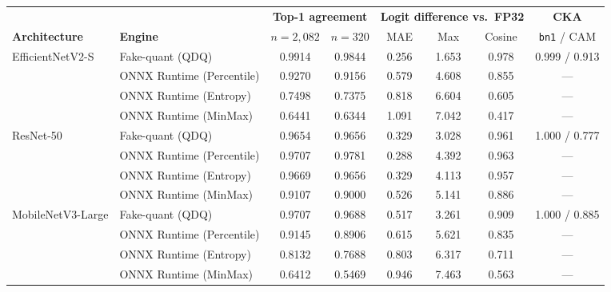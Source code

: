 \begin{tabular}{llcccccc}
\toprule
 & & \multicolumn{2}{c}{\textbf{Top-1 agreement}} & \multicolumn{3}{c}{\textbf{Logit difference vs.\ FP32}} & \textbf{CKA} \\
\cmidrule(lr){3-4}\cmidrule(lr){5-7}\cmidrule(lr){8-8}
\textbf{Architecture} & \textbf{Engine} & $n{=}2{,}082$ & $n{=}320$ & MAE & Max & Cosine & \texttt{bn1} / CAM \\
\midrule
\multirow{4}{*}{EfficientNetV2-S}
  & Fake-quant (QDQ) & 0.9914 & 0.9844 & 0.256 & 1.653 & 0.978 & 0.999 / 0.913 \\
  & ONNX Runtime (Percentile) & 0.9270 & 0.9156 & 0.579 & 4.608 & 0.855 & --- \\
  & ONNX Runtime (Entropy) & 0.7498 & 0.7375 & 0.818 & 6.604 & 0.605 & --- \\
  & ONNX Runtime (MinMax) & 0.6441 & 0.6344 & 1.091 & 7.042 & 0.417 & --- \\
\midrule
\multirow{4}{*}{ResNet-50}
  & Fake-quant (QDQ) & 0.9654 & 0.9656 & 0.329 & 3.028 & 0.961 & 1.000 / 0.777 \\
  & ONNX Runtime (Percentile) & 0.9707 & 0.9781 & 0.288 & 4.392 & 0.963 & --- \\
  & ONNX Runtime (Entropy) & 0.9669 & 0.9656 & 0.329 & 4.113 & 0.957 & --- \\
  & ONNX Runtime (MinMax) & 0.9107 & 0.9000 & 0.526 & 5.141 & 0.886 & --- \\
\midrule
\multirow{4}{*}{MobileNetV3-Large}
  & Fake-quant (QDQ) & 0.9707 & 0.9688 & 0.517 & 3.261 & 0.909 & 1.000 / 0.885 \\
  & ONNX Runtime (Percentile) & 0.9145 & 0.8906 & 0.615 & 5.621 & 0.835 & --- \\
  & ONNX Runtime (Entropy) & 0.8132 & 0.7688 & 0.803 & 6.317 & 0.711 & --- \\
  & ONNX Runtime (MinMax) & 0.6412 & 0.5469 & 0.946 & 7.463 & 0.563 & --- \\
\bottomrule
\end{tabular}
